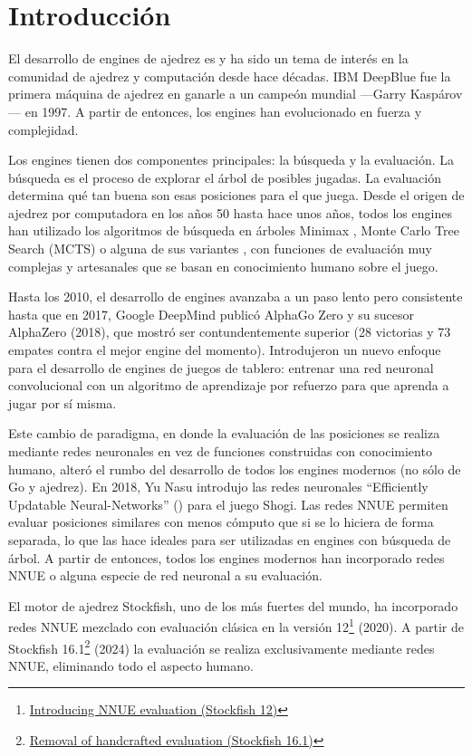 \section*{Introducción}

El desarrollo de engines de ajedrez es y ha sido un tema de interés en la comunidad de ajedrez y computación desde hace décadas. IBM DeepBlue \cite{deepblue:2002} fue la primera máquina de ajedrez en ganarle a un campeón mundial ---Garry Kaspárov--- en 1997. A partir de entonces, los engines han evolucionado en fuerza y complejidad.

Los engines tienen dos componentes principales: la búsqueda y la evaluación. La búsqueda es el proceso de explorar el árbol de posibles jugadas. La evaluación determina qué tan buena son esas posiciones para el que juega. Desde el origen de ajedrez por computadora en los años 50 hasta hace unos años, todos los engines han utilizado los algoritmos de búsqueda en árboles Minimax \cite{minimax-survey:1995}, Monte Carlo Tree Search \cite{mcts-survey:2012} (MCTS) o alguna de sus variantes \cite{tree-search-methods:2014,mcts-modifications:2022}, con funciones de evaluación muy complejas y artesanales que se basan en conocimiento humano sobre el juego.

Hasta los 2010, el desarrollo de engines avanzaba a un paso lento pero consistente hasta que en 2017, Google DeepMind publicó AlphaGo Zero \cite{alphagozero:2017} y su sucesor AlphaZero \cite{alphazero:2017,alphazero:2018} (2018), que mostró ser contundentemente superior (28 victorias y 73 empates contra el mejor engine del momento). Introdujeron un nuevo enfoque para el desarrollo de engines de juegos de tablero: entrenar una red neuronal convolucional con un algoritmo de aprendizaje por refuerzo para que aprenda a jugar por sí misma.

Este cambio de paradigma, en donde la evaluación de las posiciones se realiza mediante redes neuronales en vez de funciones construidas con conocimiento humano, alteró el rumbo del desarrollo de todos los engines modernos (no sólo de Go y ajedrez). En 2018, Yu Nasu introdujo las redes neuronales ``Efficiently Updatable Neural-Networks''  \cite{nnue:2018} () para el juego Shogi. Las redes NNUE permiten evaluar posiciones similares con menos cómputo que si se lo hiciera de forma separada, lo que las hace ideales para ser utilizadas en engines con búsqueda de árbol. A partir de entonces, todos los engines modernos han incorporado redes NNUE o alguna especie de red neuronal a su evaluación.

El motor de ajedrez Stockfish, uno de los más fuertes del mundo, ha incorporado redes NNUE mezclado con evaluación clásica en la versión 12\footnote[1]{\href{https://stockfishchess.org/blog/2020/introducing-nnue-evaluation/}{Introducing NNUE evaluation (Stockfish 12)}} (2020). A partir de Stockfish 16.1\footnote[2]{\href{https://stockfishchess.org/blog/2024/stockfish-16-1/}{Removal of handcrafted evaluation (Stockfish 16.1)}} (2024) la evaluación se realiza exclusivamente mediante redes NNUE, eliminando todo el aspecto humano.

